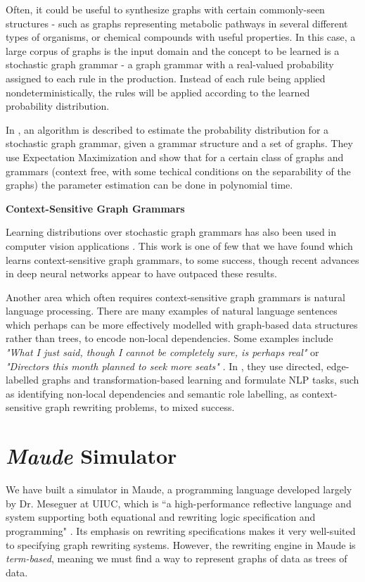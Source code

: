 \documentclass[]{article}
\begin{document}
Often, it could be useful to synthesize graphs with certain commonly-seen
structures - such as graphs representing metabolic pathways in several different
types of organisms, or chemical compounds with useful properties. In this case,
a large corpus of graphs is the input domain and the concept to be learned is a
stochastic graph grammar - a graph grammar with a real-valued probability
assigned to each rule in the production. Instead of each rule being applied
nondeterministically, the rules will be applied according to the learned
probability distribution.

In \cite{oates2003estimating}, an algorithm is described to estimate the
probability distribution for a stochastic graph grammar, given a grammar
structure and a set of graphs. They use Expectation Maximization and show that
for a certain class of graphs and grammars (context free, with some techical
conditions on the separability of the graphs) the parameter estimation can be
done in polynomial time.

\textbf{Context-Sensitive Graph Grammars}

Learning distributions over stochastic graph grammars has also been used in
computer vision applications \cite{zhu2007stochastic}. This work is one of few
that we have found which learns context-sensitive graph grammars, to some
success, though recent advances in deep neural networks appear to have outpaced
these results.

Another area which often requires context-sensitive graph grammars is natural
language processing. There are many examples of natural language sentences which
perhaps can be more effectively modelled with graph-based data structures
rather than trees, to encode non-local dependencies. Some examples include
\emph{"What I just said, though I cannot be completely sure, is perhaps real"}
\cite{zhu2007stochastic} or \emph{"Directors this month planned to seek more
seats"} \cite{jijkoun2007learning}. In \cite{jijkoun2007learning}, they use
directed, edge-labelled graphs and transformation-based learning and formulate
NLP tasks, such as identifying non-local dependencies and semantic role
labelling, as context-sensitive graph rewriting problems, to mixed success.


\section{\emph{Maude} Simulator}

We have built a simulator in Maude, a programming language developed largely by
Dr. Meseguer at UIUC, which is ``a high-performance
reflective language and system supporting both equational and rewriting logic
specification and programming" \cite{maude}. Its emphasis on rewriting
specifications makes it very well-suited to specifying graph rewriting systems.
However, the rewriting engine in Maude is \emph{term-based}, meaning we must
find a way to represent graphs of data as trees of data.
\end{document}
